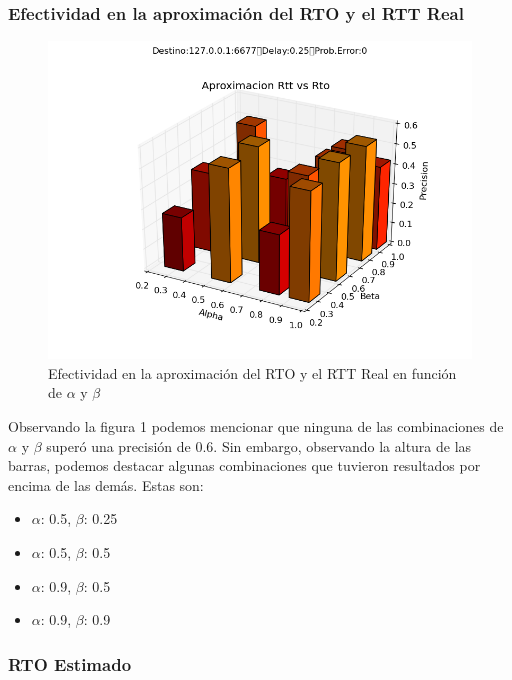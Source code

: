 
\subsubsection{Efectividad en la aproximaci\'on del RTO y el RTT Real}

\begin{figure}[H]
  \centering	
	\includegraphics[scale=0.5]{../analisis/graficos_tablas/graficos_en_funcion_de_alfa_y_beta/graficos/rtt_vs_rto.png}
  \caption{Efectividad en la aproximaci\'on del RTO y el RTT Real en funci\'on de $\alpha$ y $\beta$}
	\label{fig:histo-src-sitiotrabajo}
\end{figure}

Observando la figura 1 podemos mencionar que ninguna de las combinaciones de $\alpha$ y $\beta$ super\'o una precisi\'on de 0.6. Sin embargo, observando la altura de las barras, podemos destacar algunas combinaciones que tuvieron resultados por encima de las dem\'as. Estas son:
\begin{itemize}
	\item $\alpha$: 0.5, $\beta$: 0.25
	\item $\alpha$: 0.5, $\beta$: 0.5
	\item $\alpha$: 0.9, $\beta$: 0.5
	\item $\alpha$: 0.9, $\beta$: 0.9
\end{itemize} 

\subsubsection{RTO Estimado}

